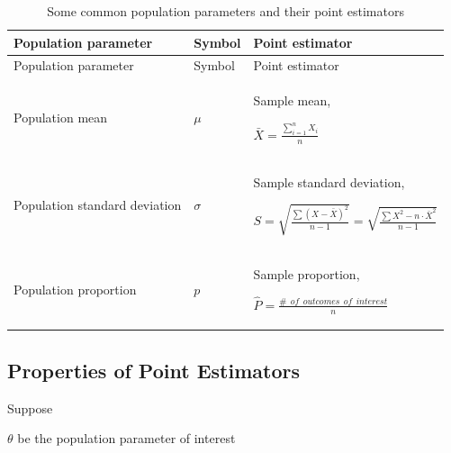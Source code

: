 \documentclass[
  11pt,
  letterpaper,
  DIV=11,
  numbers=noendperiod]{scrreprt}
\begin{document}
\begin{longtable}[]{@{}
  >{\raggedright\arraybackslash}p{}
  >{\centering\arraybackslash}p{}
  >{\centering\arraybackslash}p{}@{}}
\caption{Some common population parameters and their point
estimators}\tabularnewline
\toprule\noalign{}
\begin{minipage}[b]{\linewidth}\raggedright
Population parameter
\end{minipage} & \begin{minipage}[b]{\linewidth}\centering
Symbol
\end{minipage} & \begin{minipage}[b]{\linewidth}\centering
Point estimator
\end{minipage} \\
\midrule\noalign{}
\endfirsthead
\toprule\noalign{}
\begin{minipage}[b]{\linewidth}\raggedright
Population parameter
\end{minipage} & \begin{minipage}[b]{\linewidth}\centering
Symbol
\end{minipage} & \begin{minipage}[b]{\linewidth}\centering
Point estimator
\end{minipage} \\
\midrule\noalign{}
\endhead
\bottomrule\noalign{}
\endlastfoot
Population mean & \(\mu\) & Sample mean,

\(\bar X=\frac{\sum_{i=1}^n X_i}{n}\) \\
Population standard deviation & \(\sigma\) & Sample standard deviation,

\(S=\sqrt{\frac{\sum(X-\bar X)^2}{n-1}}=\sqrt {\frac{\sum X^2 -n\cdot \bar X^2}{n-1}}\) \\
Population proportion & \(p\) & Sample proportion,

\(\hat P=\frac{\# \ \ of \ \  outcomes\ \ of  \ \ interest }{n}\) \\
\end{longtable}

\subsection{Properties of Point
Estimators}\label{properties-of-point-estimators}

Suppose

\(\theta\) be the population parameter of interest
\end{document}
